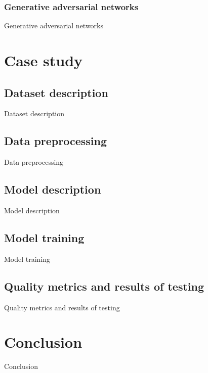 \documentclass{article}
\begin{document}
\subsubsection{Generative adversarial networks}
Generative adversarial networks

\section{Case study}

\subsection{Dataset description}
Dataset description

\subsection{Data preprocessing}
Data preprocessing

\subsection{Model description}
Model description

\subsection{Model training}
Model training

\subsection{Quality metrics and results of testing}
Quality metrics and results of testing

\section{Conclusion}
Conclusion


\end{document}
